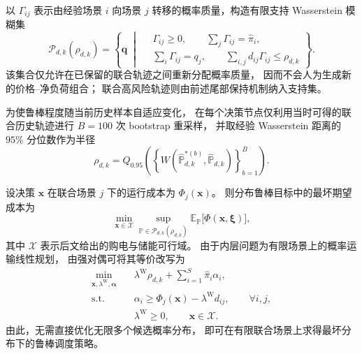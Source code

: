 \documentclass[zihao=-4,a4paper,UTF8,fontset=none]{ctexart}
\begin{document}
以 $\Gamma_{ij}$ 表示由经验场景 $i$ 向场景 $j$
转移的概率质量，构造有限支持 Wasserstein 模糊集
\begin{equation}
\mathcal P_{d,k}(\rho_{d,k})
=
\left\{
\mathbf q\; \middle|\;
\begin{aligned}
&\Gamma_{ij}\ge0,\qquad
\sum_j\Gamma_{ij}=\widehat\pi_i,\\
&\sum_i\Gamma_{ij}=q_j,\qquad
\sum_{i,j}d_{ij}\Gamma_{ij}\le\rho_{d,k}
\end{aligned}
\right\}.
\label{eq:q4_wasserstein_set}
\end{equation}
该集合仅允许在已保留的联合轨迹之间重新分配概率质量，
因而不会人为生成新的价格--净负荷组合；
联合高风险轨迹则由前述尾部保持机制纳入支持集。

为使鲁棒程度随当前历史样本自适应变化，
在每个决策节点仅利用当时可得的联合历史轨迹进行
$B=100$ 次 bootstrap 重采样，
并取经验 Wasserstein 距离的 $95\%$ 分位数作为半径
\begin{equation}
    \rho_{d,k}
    =
    Q_{0.95}
    \left(
        \left\{
        W\!\left(
        \widehat{\mathbb P}_{d,k}^{*(b)},
        \widehat{\mathbb P}_{d,k}
        \right)
        \right\}_{b=1}^{B}
    \right).
    \label{eq:q4_wasserstein_radius}
\end{equation}

设决策 $\mathbf x$ 在联合场景 $j$ 下的运行成本为
$\Phi_j(\mathbf x)$。
则分布鲁棒目标中的最坏期望成本为
\begin{equation}
    \min_{\mathbf x\in\mathcal X}
    \sup_{\mathbb P\in\mathcal P_{d,k}(\rho_{d,k})}
    \mathbb E_{\mathbb P}
    \bigl[\Phi(\mathbf x,\boldsymbol\xi)\bigr],
    \label{eq:q4_dro_objective}
\end{equation}
其中 $\mathcal X$ 表示后文给出的购电与储能可行域。
由于内层问题为有限场景上的概率运输线性规划，
由强对偶可将其等价改写为
\begin{equation}
\begin{aligned}
    \min_{\mathbf x,\lambda^{\mathrm W},\boldsymbol\alpha}\quad
    &\lambda^{\mathrm W}\rho_{d,k}
    +\sum_{i=1}^{S}\widehat\pi_i\alpha_i,\\
    \mathrm{s.t.}\quad
    &\alpha_i
    \ge
    \Phi_j(\mathbf x)
    -
    \lambda^{\mathrm W}d_{ij},
    \qquad \forall i,j,\\
    &\lambda^{\mathrm W}\ge0,\qquad
    \mathbf x\in\mathcal X .
\end{aligned}
\label{eq:q4_dro_dual}
\end{equation}
由此，无需直接优化无限多个候选概率分布，
即可在有限联合场景上求得最坏分布下的鲁棒调度策略。
\end{document}
